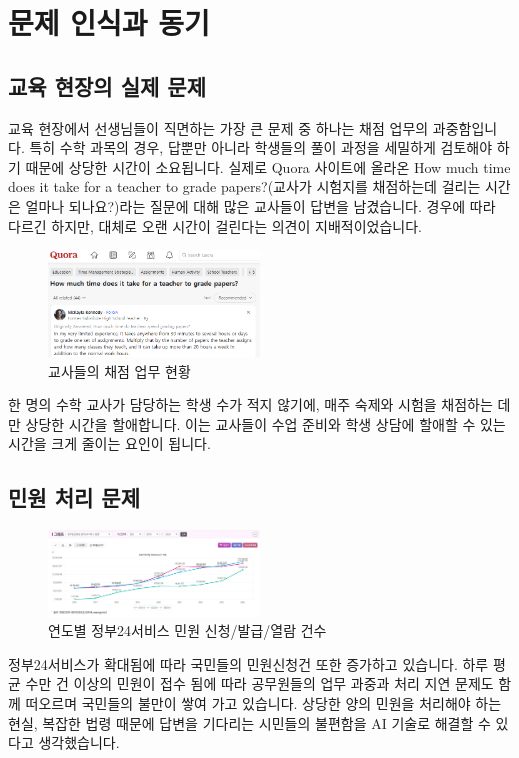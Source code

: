 \section{문제 인식과 동기}

\subsection{교육 현장의 실제 문제}

교육 현장에서 선생님들이 직면하는 가장 큰 문제 중 하나는 채점 업무의 과중함입니다. 특히 수학 과목의 경우, 답뿐만 아니라 학생들의 풀이 과정을 세밀하게 검토해야 하기 때문에 상당한 시간이 소요됩니다. 
  실제로 Quora 사이트에 올라온 How much time does it take for a teacher to grade papers?(교사가 시험지를 채점하는데 걸리는 시간은 얼마나 되나요?)라는 질문에 대해 많은 교사들이 답변을 남겼습니다. 경우에 따라 다르긴 하지만, 대체로 오랜 시간이 걸린다는 의견이 지배적이었습니다.
\begin{figure}[H]
    \centering
    \includegraphics[width=0.5\textwidth]{1/image03.png}
    \caption{교사들의 채점 업무 현황}
    \label{fig:teacher_workload}
\end{figure}

한 명의 수학 교사가 담당하는 학생 수가 적지 않기에, 매주 숙제와 시험을 채점하는 데만 상당한 시간을 할애합니다. 이는 교사들이 수업 준비와 학생 상담에 할애할 수 있는 시간을 크게 줄이는 요인이 됩니다.

\subsection{민원 처리 문제}

\begin{figure}[H]
    \centering
    \includegraphics[width=0.5\textwidth]{1/image06.png}
    \caption{연도별 정부24서비스 민원 신청/발급/열람 건수}
    \label{fig:kiosk_elderly_struggle}
\end{figure}
 정부24서비스가 확대됨에 따라 국민들의 민원신청건 또한 증가하고 있습니다. 하루 평균 수만 건 이상의 민원이 접수 됨에 따라 공무원들의 업무 과중과 처리 지연 문제도 함께 떠오르며 국민들의 불만이 쌓여 가고 있습니다. 상당한 양의 민원을 처리해야 하는 현실, 복잡한 법령 때문에 답변을 기다리는 시민들의 불편함을 AI 기술로 해결할 수 있다고 생각했습니다.

